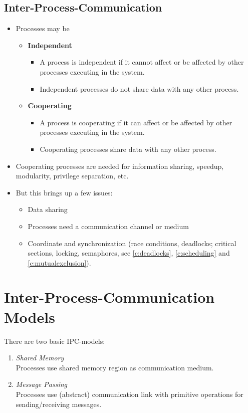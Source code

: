 		\subsection{Inter-Process-Communication}
			\begin{itemize}
				\item Processes may be
					\begin{itemize}
						\item \textbf{Independent}
							\begin{itemize}
								\item A process is independent if it cannot affect or be affected by other processes executing in the system.
								\item Independent processes do not share data with any other process.
							\end{itemize}
						\item \textbf{Cooperating}
							\begin{itemize}
								\item A process is cooperating if it can affect or be affected by other processes executing in the system.
								\item Cooperating processes share data with any other process.
							\end{itemize}
					\end{itemize}
				\item Cooperating processes are needed for information sharing, speedup, modularity, privilege separation, etc.
				\item But this brings up a few issues:
					\begin{itemize}
						\item Data sharing
						\item Processes need a communication channel or medium
						\item Coordinate and synchronization (race conditions, deadlocks; critical sections, locking, semaphores, see \ref{c:deadlocks}, \ref{c:scheduling} and \ref{c:mutualexclusion}).
					\end{itemize}
			\end{itemize}

	\section{Inter-Process-Communication Models}
		There are two basic IPC-models:
		\begin{enumerate}
			\item \textit{Shared Memory} \\ Processes use shared memory region as communication medium.
			\item \textit{Message Passing} \\ Processes use (abstract) communication link with primitive operations for sending/receiving messages.
		\end{enumerate}

